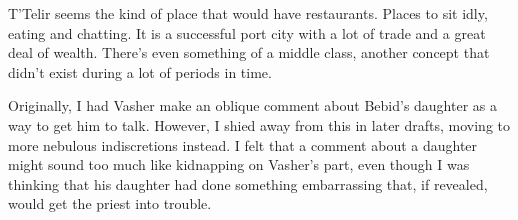 T’Telir seems the kind of place that would have restaurants. Places to sit idly, eating and chatting. It is a successful port city with a lot of trade and a great deal of wealth. There’s even something of a middle class, another concept that didn’t exist during a lot of periods in time.

Originally, I had Vasher make an oblique comment about Bebid’s daughter as a way to get him to talk. However, I shied away from this in later drafts, moving to more nebulous indiscretions instead. I felt that a comment about a daughter might sound too much like kidnapping on Vasher’s part, even though I was thinking that his daughter had done something embarrassing that, if revealed, would get the priest into trouble.



